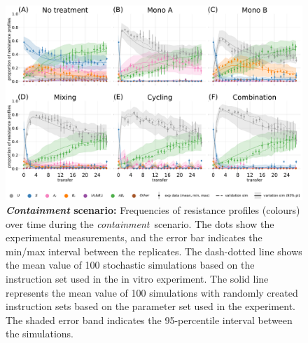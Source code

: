 \begin{figure}[p]
  \centering
  \includegraphics[width = \linewidth]{chapter_2_sup/figures/20220127_timeplot.pdf}
  \caption{\textbf{\textit{Containment} scenario:}
    Frequencies of resistance profiles (colours) over time during the \textit{containment}~scenario.
    The dots show the experimental measurements, and the error bar indicates the min/max interval between the replicates.
    The dash-dotted line shows the mean value of 100 stochastic simulations based on the instruction set used in the in vitro experiment.
    The solid line represents the mean value of 100 simulations with randomly created instruction sets based on the parameter set used in the experiment.
  The shaded error band indicates the 95-percentile interval between the simulations.}
  \label{fig:exp2}
\end{figure}

